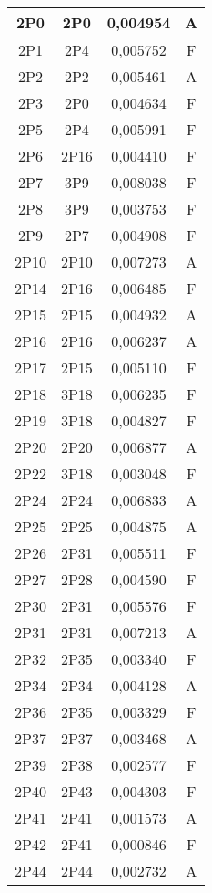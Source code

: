 \begin{center}
\begin{longtable}{|c|c|c|c|}
    \hline	2P0	&	2P0	&	0,004954	&	A	\\
    \hline	2P1	&	2P4	&	0,005752	&	F	\\
    \hline	2P2	&	2P2	&	0,005461	&	A	\\
    \hline	2P3	&	2P0	&	0,004634	&	F	\\
    \hline	2P5	&	2P4	&	0,005991	&	F	\\
    \hline	2P6	&	2P16	&	0,004410	&	F	\\
    \hline	2P7	&	3P9	&	0,008038	&	F	\\
    \hline	2P8	&	3P9	&	0,003753	&	F	\\
    \hline	2P9	&	2P7	&	0,004908	&	F	\\
    \hline	2P10	&	2P10	&	0,007273	&	A	\\
    \hline	2P14	&	2P16	&	0,006485	&	F	\\
    \hline	2P15	&	2P15	&	0,004932	&	A	\\
    \hline	2P16	&	2P16	&	0,006237	&	A	\\
    \hline	2P17	&	2P15	&	0,005110	&	F	\\
    \hline	2P18	&	3P18	&	0,006235	&	F	\\
    \hline	2P19	&	3P18	&	0,004827	&	F	\\
    \hline	2P20	&	2P20	&	0,006877	&	A	\\
    \hline	2P22	&	3P18	&	0,003048	&	F	\\
    \hline	2P24	&	2P24	&	0,006833	&	A	\\
    \hline	2P25	&	2P25	&	0,004875	&	A	\\
    \hline	2P26	&	2P31	&	0,005511	&	F	\\
    \hline	2P27	&	2P28	&	0,004590	&	F	\\
    \hline	2P30	&	2P31	&	0,005576	&	F	\\
    \hline	2P31	&	2P31	&	0,007213	&	A	\\
    \hline	2P32	&	2P35	&	0,003340	&	F	\\
    \hline	2P34	&	2P34	&	0,004128	&	A	\\
    \hline	2P36	&	2P35	&	0,003329	&	F	\\
    \hline	2P37	&	2P37	&	0,003468	&	A	\\
    \hline	2P39	&	2P38	&	0,002577	&	F	\\
    \hline	2P40	&	2P43	&	0,004303	&	F	\\
    \hline	2P41	&	2P41	&	0,001573	&	A	\\
    \hline	2P42	&	2P41	&	0,000846	&	F	\\
    \hline	2P44	&	2P44	&	0,002732	&	A	\\

\end{longtable}
\end{center}
